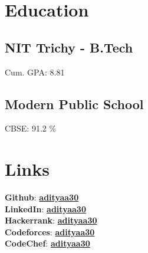 \documentclass[]{deedy-resume-openfont}
\begin{document}
\lastupdated


\begin{minipage}[t]{0.30\textwidth}

\section{Education}

\subsection{NIT Trichy - B.Tech}
Cum. GPA: 8.81 \\
\sectionsep

\subsection{Modern Public School}
CBSE: 91.2 \% \\


\section{Links}
\textbf{Github}: \href{https://github.com/adityaa30}{\textbf{adityaa30}} \\
\textbf{LinkedIn}: \href{https://www.linkedin.com/in/adityaa30/}{\textbf{adityaa30}} \\
\textbf{Hackerrank}: \href{https://www.hackerrank.com/adityaa30?hr_r=1}{\textbf{adityaa30}} \\
\textbf{Codeforces}: \href{https://codeforces.com/profile/adityaa30}{\textbf{adityaa30}} \\
\textbf{CodeChef}: \href{https://www.codechef.com/users/adityaa30}{\textbf{adityaa30}}


\end{minipage}
\end{document}
